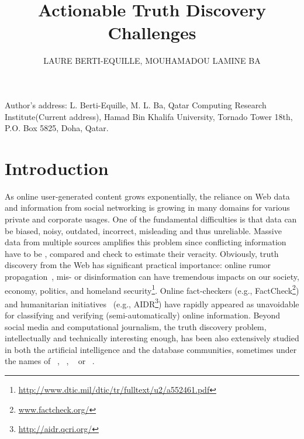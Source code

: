 \documentclass[prodmode,acmtecs]{acmsmall} %
\begin{document}
\title{Actionable Truth Discovery Challenges}
\author{LAURE BERTI-EQUILLE, MOUHAMADOU LAMINE BA
}



\begin{bottomstuff}
Author's address: L. Berti-Equille, M. L. Ba, Qatar Computing Research Institute(Current address), Hamad
Bin Khalifa University, Tornado Tower 18th, P.O. Box 5825, Doha, Qatar.
\end{bottomstuff}

\maketitle


\section{Introduction}
As online user-generated content grows exponentially, the reliance on Web data and information from social 
networking is growing in many domains for various private and corporate usages. 
One of the fundamental difficulties is that data can be biased, noisy, outdated, incorrect, misleading and
thus unreliable. Massive data from multiple sources amplifies this problem since conflicting information
have to be , compared  and check to estimate their veracity. Obviously, truth discovery from 
the Web has significant practical importance: online rumor propagation~\cite{rumor-icdm2013}, mis- or disinformation
can have tremendous impacts on our society, economy, politics, and homeland security\footnote{\scriptsize{\url{http://www.dtic.mil/dtic/tr/fulltext/u2/a552461.pdf}}}. 
Online fact-checkers (e.g., FactCheck\footnote{\scriptsize{\url{www.factcheck.org/}}}) and humanitarian initiatives~\cite{ImranECDM13}
(e.g., AIDR\footnote{\scriptsize{\url{http://aidr.qcri.org/}}}) have rapidly appeared as unavoidable for classifying and verifying 
(semi-automatically) online information. Beyond social media and computational journalism, the truth discovery problem, intellectually 
and technically interesting enough, has been also extensively studied in both the artificial intelligence and the database communities,
sometimes under the names of  ~\cite{GoasdoueKKLMZ13}, ~\cite{Thirunarayan2014182},
~\cite{PasternackR13} or ~\cite{GallandAMS10}. 
\end{document}
